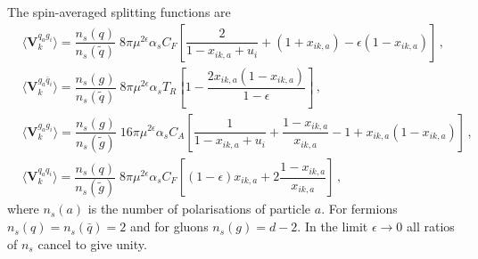 \documentclass[main.tex]{subfiles}
\begin{document}
        The spin-averaged splitting functions are
        \begin{align}\label{eqn:V_aik}
            &\langle \boldsymbol{V}_{k}^{q_{a}g_{i}} \rangle = \dfrac{n_{s}(q)}{n_{s}(\tilde{q})} \; 8\pi \mu^{2\epsilon} \alpha_{s} C_{F} \left[\dfrac{2}{1-x_{ik,a} + u_{i}} + (1+x_{ik,a}) - \epsilon(1-x_{ik,a})\right] \, , \nonumber \\
            &\langle \boldsymbol{V}_{k}^{g_{a}\bar{q}_{i}} \rangle = \dfrac{n_{s}(g)}{n_{s}(\tilde{q})} \; 8\pi \mu^{2\epsilon} \alpha_{s} T_{R} \left[1 - \dfrac{2x_{ik,a}(1-x_{ik,a})}{1-\epsilon}\right] \, , \nonumber \\
            &\langle \boldsymbol{V}_{k}^{g_{a}g_{i}} \rangle = \dfrac{n_{s}(g)}{n_{s}(\tilde{g})} \; 16\pi \mu^{2\epsilon} \alpha_{s} C_{A} \left[\dfrac{1}{1-x_{ik,a} + u_{i}} + \dfrac{1-x_{ik,a}}{x_{ik,a}} - 1 + x_{ik,a}(1-x_{ik,a}) \right] \, , \nonumber \\
            &\langle \boldsymbol{V}_{k}^{q_{a}q_{i}} \rangle = \dfrac{n_{s}(q)}{n_{s}(\tilde{g})} \; 8\pi \mu^{2\epsilon} \alpha_{s} C_{F} \left[(1-\epsilon)x_{ik,a} + 2\dfrac{1-x_{ik,a}}{x_{ik,a}} \right] \, ,
        \end{align}
        where $n_{s}(a)$ is the number of polarisations of particle $a$.
        For fermions $n_{s}(q) = n_{s}(\bar{q}) = 2$
        and for gluons $n_{s}(g) = d-2$. In the limit $\epsilon \rightarrow 0$
        all ratios of $n_{s}$ cancel to give unity.
\end{document}
